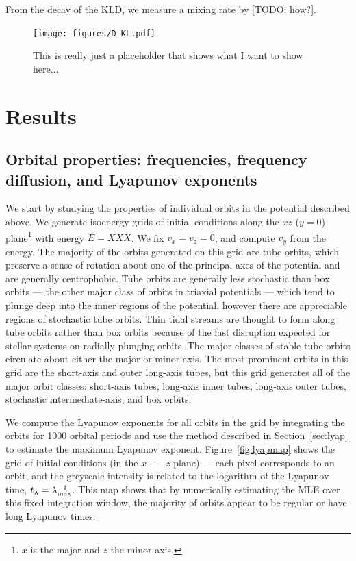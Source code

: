 \documentclass[letterpaper,12pt,preprint]{aastex}
\begin{document}
From the decay of the KLD, we measure a mixing rate by [TODO: how?].

\begin{figure}[!h]
\begin{center}
\texttt{[image: figures/D\_KL.pdf]}
\caption{This is really just a placeholder that shows what I want to show here...} \label{fig:DKL}
\end{center}
\end{figure}

\section{Results}\label{sec:results}

\subsection{Orbital properties: frequencies, frequency diffusion, and Lyapunov exponents}

We start by studying the properties of individual orbits in the potential described above. We generate isoenergy grids of initial conditions along the $xz$ ($y=0$) plane\footnote{$x$ is the major and $z$ the minor axis.} with energy $E=XXX$. We fix $v_x = v_z = 0$, and compute $v_y$ from the energy. The majority of the orbits generated on this grid are tube orbits, which preserve a sense of rotation about one of the principal axes of the potential and are generally centrophobic. Tube orbits are generally less stochastic than box orbits --- the other major class of orbits in triaxial potentials --- which tend to plunge deep into the inner regions of the potential, however there are appreciable regions of stochastic tube orbits. Thin tidal streams are thought to form along tube orbits rather than box orbits because of the fast disruption expected for stellar systems on radially plunging orbits. The major classes of stable tube orbits circulate about either the major or minor axis. The most prominent orbits in this grid are the short-axis and outer long-axis tubes, but this grid generates all of the major orbit classes: short-axis tubes, long-axis inner tubes, long-axis outer tubes, stochastic intermediate-axis, and box orbits. 

We compute the Lyapunov exponents for all orbits in the grid by integrating the orbits for 1000 orbital periods and use the method described in Section~\ref{sec:lyap} to estimate the maximum Lyapunov exponent. Figure~\ref{fig:lyapmap} shows the grid of initial conditions (in the $x--z$ plane) --- each pixel corresponds to an orbit, and the greyscale intensity is related to the logarithm of the Lyapunov time, $t_\lambda = \lambda_{\rm max}^{-1}$. This map shows that by numerically estimating the MLE over this fixed integration window, the majority of orbits appear to be regular or have long Lyapunov times.
\end{document}
